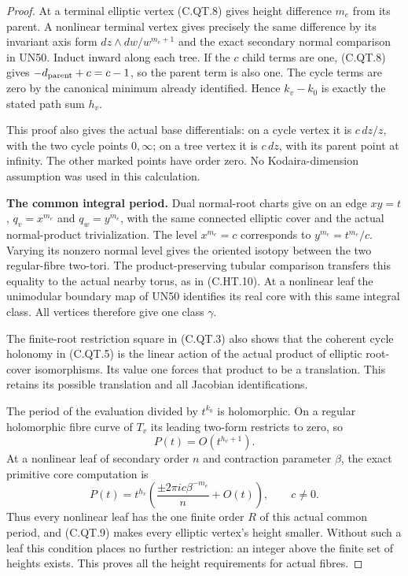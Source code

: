 \begin{proof}
At a terminal elliptic vertex (C.QT.8) gives
height difference $m_e$ from its parent. A
nonlinear terminal vertex gives precisely the
same difference by its invariant axis form
$dz\wedge dw/w^{m_e+1}$ and the exact secondary
normal comparison in UN50. Induct inward along
each tree. If the $c$ child terms are one,
(C.QT.8) gives $-d_{\rm parent}+c=c-1$,
so the parent term is also one. The cycle
terms are zero by the canonical minimum
already identified. Hence $k_v-k_0$ is exactly
the stated path sum $h_v$.

This proof also gives the actual base differentials:
on a cycle vertex it is $c\,dz/z$, with the two
cycle points $0,\infty$; on a tree vertex it is
$c\,dz$, with its parent point at infinity.
The other marked points have order zero.
No Kodaira-dimension assumption was used in
this calculation.

\par\medskip\noindent\textbf{The common integral period.}
Dual normal-root charts give on an edge
$xy=t$, $q_v=x^{m_e}$ and $q_w=y^{m_e}$,
with the same connected elliptic cover and
the actual normal-product trivialization.
The level $x^{m_e}=c$ corresponds to
$y^{m_e}=t^{m_e}/c$. Varying its nonzero
normal level gives the oriented isotopy
between the two regular-fibre two-tori.
The product-preserving tubular comparison
transfers this equality to the actual
nearby torus, as in (C.HT.10).
At a nonlinear leaf the unimodular boundary
map of UN50 identifies its real core with
this same integral class. All vertices
therefore give one class $\gamma$.

The finite-root restriction square in
(C.QT.3) also shows that the coherent
cycle holonomy in (C.QT.5) is the linear
action of the actual product of elliptic
root-cover isomorphisms. Its value one
forces that product to be a translation.
This retains its possible translation
and all Jacobian identifications.

The period of the evaluation divided by
$t^{k_0}$ is holomorphic. On a regular
holomorphic fibre curve of $T_v$ its
leading two-form restricts to zero, so
\[
                  P(t)=O(t^{h_v+1}).
\tag{C.QT.9}
\]
At a nonlinear leaf of secondary order
$n$ and contraction parameter $\beta$,
the exact primitive core computation is
\[
 P(t)=t^{h_v}
       \left(\frac{\pm2\pi i c\beta^{-m_e}}n+O(t)\right),
                         \qquad c\ne0.
\tag{C.QT.10}
\]
Thus every nonlinear leaf has the one
finite order $R$ of this actual common
period, and (C.QT.9) makes every elliptic
vertex's height smaller. Without such a
leaf this condition places no further
restriction: an integer above the finite
set of heights exists. This proves all
the height requirements for actual fibres.


\end{proof}
